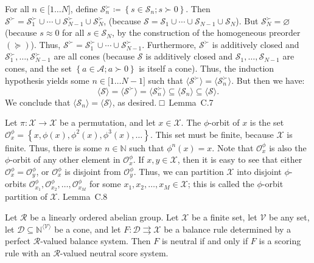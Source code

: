 \documentclass[
]{article}
\begin{document}
For all \(n \in \lbrack 1\ldots N\rbrack\), define
\(\mathcal{S}_{n}^{\succ} ≔ \left\{ s \in \mathcal{S}_{n};s \succ 0 \right\}\).
Then
\(\mathcal{S}^{\succ} = \mathcal{S}_{1}^{\succ} \cup \cdots \cup \mathcal{S}_{N - 1}^{\succ} \cup \mathcal{S}_{N}^{\succ}\),
(because
\(\mathcal{S} = \mathcal{S}_{1} \cup \cdots \cup \mathcal{S}_{N - 1} \cup \mathcal{S}_{N}\)).
But \(\mathcal{S}_{N}^{\succ} = \varnothing\) (because
\(s \approx 0\) for all \(s \in \mathcal{S}_{N}\), by the construction
of the homogeneous preorder \(( \succeq )\)). Thus,
\(\mathcal{S}^{\succ} = \mathcal{S}_{1}^{\succ} \cup \cdots \cup \mathcal{S}_{N - 1}^{\succ}\).
Furthermore, \(\mathcal{S}^{\succ}\) is additively closed and
\(\mathcal{S}_{1}^{\succ},\ldots,\mathcal{S}_{N - 1}^{\succ}\) are all
cones (because \(\mathcal{S}\) is additively closed and
\(\mathcal{S}_{1},\ldots,\mathcal{S}_{N - 1}\) are cones, and the set
\(\left\{ a \in \mathcal{A};a \succ 0 \right\}\) is itself a cone).
Thus, the induction hypothesis yields some
\(n \in \lbrack 1\ldots N - 1\rbrack\) such that
\({\langle\mathcal{S}^{\succ}\rangle} = {\langle\mathcal{S}_{n}^{\succ}\rangle}\).
But then we have:
\[{\langle\mathcal{S}\rangle} = {\langle\mathcal{S}^{\succ}\rangle} = {\langle\mathcal{S}_{n}^{\succ}\rangle} \subseteq {\langle\mathcal{S}_{n}\rangle} \subseteq {\langle\mathcal{S}\rangle}\text{.}\]
We conclude that
\({\langle\mathcal{S}_{n}\rangle} = {\langle\mathcal{S}\rangle}\), as
desired. □~Lemma~C.7

Let \(\left. \pi:\mathcal{X}\longrightarrow\mathcal{X} \right.\) be a
permutation, and let \(x \in \mathcal{X}\). The \(\phi\)-orbit of \(x\)
is the set
\(\mathcal{O}_{x}^{\phi} = \left\{ x,\phi(x),\phi^{2}(x),\phi^{3}(x),\ldots \right\}\).
This set must be finite, because \(\mathcal{X}\) is finite. Thus, there
is some \(n \in \mathbb{N}\) such that \(\phi^{n}(x) = x\). Note that
\(\mathcal{O}_{x}^{\phi}\) is also the \(\phi\)-orbit of any other
element in \(\mathcal{O}_{x}^{\phi}\). If \(x,y \in \mathcal{X}\), then
it is easy to see that either
\(\mathcal{O}_{x}^{\phi} = \mathcal{O}_{y}^{\phi}\), or
\(\mathcal{O}_{x}^{\phi}\) is disjoint from \(\mathcal{O}_{y}^{\phi}\).
Thus, we can partition \(\mathcal{X}\) into disjoint \(\phi\)-orbits
\(\mathcal{O}_{x_{1}}^{\phi},\mathcal{O}_{x_{2}}^{\phi},\ldots,\mathcal{O}_{x_{M}}^{\phi}\)
for some \(x_{1},x_{2},\ldots,x_{M} \in \mathcal{X}\); this is called
the \(\phi\)-orbit partition of \(\mathcal{X}\). Lemma~C.8

Let \(\mathcal{R}\) be a linearly ordered abelian group. Let
\(\mathcal{X}\) be a finite set, let \(\mathcal{V}\) be any set, let
\(\mathcal{D} \subseteq \mathbb{N}^{\langle\mathcal{V}\rangle}\) be a
cone, and let
\(\left. F:\mathcal{D}\rightrightarrows\mathcal{X} \right.\) be a
balance rule determined by a perfect \(\mathcal{R}\)-valued balance
system. Then \(F\) is neutral if and only if \(F\) is a scoring rule
with an \(\mathcal{R}\)-valued neutral score system.
\end{document}
